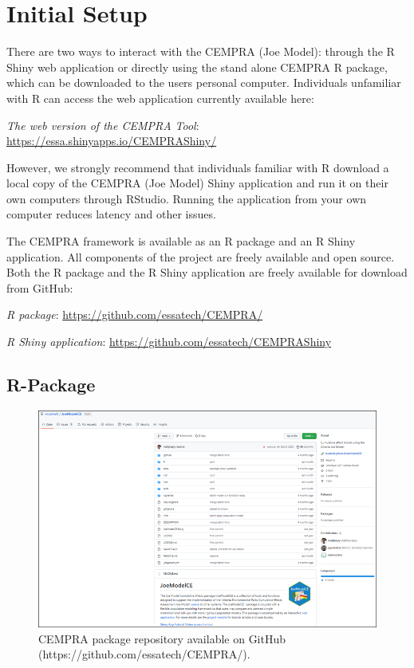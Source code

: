 \documentclass[
  letterpaper,
  DIV=11,
  numbers=noendperiod]{scrreprt}
\begin{document}

\hypertarget{initial-setup}{%
\chapter{Initial Setup}\label{initial-setup}}

There are two ways to interact with the CEMPRA (Joe Model): through the
R Shiny web application or directly using the stand alone CEMPRA R
package, which can be downloaded to the users personal computer.
Individuals unfamiliar with R can access the web application currently
available here:

\emph{The web version of the CEMPRA Tool}:
\url{https://essa.shinyapps.io/CEMPRAShiny/}

However, we strongly recommend that individuals familiar with R download
a local copy of the CEMPRA (Joe Model) Shiny application and run it on
their own computers through RStudio. Running the application from your
own computer reduces latency and other issues.

The CEMPRA framework is available as an R package and an R Shiny
application. All components of the project are freely available and open
source. Both the R package and the R Shiny application are freely
available for download from GitHub:

\emph{R package}: \url{https://github.com/essatech/CEMPRA/}

\emph{R Shiny application}:
\url{https://github.com/essatech/CEMPRAShiny}

\hypertarget{r-package}{%
\section{R-Package}\label{r-package}}

\begin{figure}

{\centering \includegraphics{images/image010.png}

}

\caption{\label{fig-figure6}CEMPRA package repository available on
GitHub (https://github.com/essatech/CEMPRA/).}

\end{figure}
\end{document}

